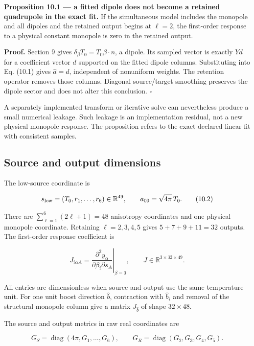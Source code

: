 \documentclass[
  11pt,
  a4paper]{article}
\begin{document}
\textbf{Proposition 10.1 --- a fitted dipole does not become a retained quadrupole in the exact fit.} If the simultaneous model includes the monopole and all dipoles and the retained output begins at \(\ell=2\), the first-order response to a physical constant monopole is zero in the retained output.

\textbf{Proof.} Section 9 gives \(\delta_\beta T_0=T_0\beta\cdot n\), a dipole. Its sampled vector is exactly \(Yd\) for a coefficient vector \(d\) supported on the fitted dipole columns. Substituting into Eq. (10.1) gives \(\widehat a=d\), independent of nonuniform weights. The retention operator removes those columns. Diagonal source/target smoothing preserves the dipole sector and does not alter this conclusion. \(\square\)

A separately implemented transform or iterative solve can nevertheless produce a small numerical leakage. Such leakage is an implementation residual, not a new physical monopole response. The proposition refers to the exact declared linear fit with consistent samples.

\hypertarget{source-and-output-dimensions}{%
\subsection{Source and output dimensions}\label{source-and-output-dimensions}}

The low-source coordinate is

\[
s_{\rm low}=(T_0,r_1,\ldots,r_6)\in\mathbb R^{49},
\qquad a_{00}=\sqrt{4\pi}\,T_0.
\tag{10.2}
\]

There are \(\sum_{\ell=1}^{6}(2\ell+1)=48\) anisotropy coordinates and one physical monopole coordinate. Retaining \(\ell=2,3,4,5\) gives \(5+7+9+11=32\) outputs. The first-order response coefficient is

\[
J_{i\alpha A}
=\left.\frac{\partial^2y_\alpha}
{\partial\beta_i\partial s_A}\right|_{\beta=0},
\qquad J\in\mathbb R^{3\times32\times49}.
\tag{10.3}
\]

All entries are dimensionless when source and output use the same temperature unit. For one unit boost direction \(\widehat b\), contraction with \(\widehat b_i\) and removal of the structural monopole column give a matrix \(J_{\widehat b}\) of shape \(32\times48\).

The source and output metrics in raw real coordinates are

\[
G_S=\operatorname{diag}(4\pi,G_1,\ldots,G_6),\qquad
G_R=\operatorname{diag}(G_2,G_3,G_4,G_5).
\tag{10.4}
\]
\end{document}

